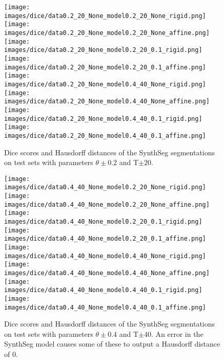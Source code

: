 \begin{figure}
  \centering
  \texttt{[image: images/dice/data0.2\_20\_None\_model0.2\_20\_None\_rigid.png]}
  \texttt{[image: images/dice/data0.2\_20\_None\_model0.2\_20\_None\_affine.png]}
  \\
  \texttt{[image: images/dice/data0.2\_20\_None\_model0.2\_20\_0.1\_rigid.png]}
  \texttt{[image: images/dice/data0.2\_20\_None\_model0.2\_20\_0.1\_affine.png]}
  \\
  \texttt{[image: images/dice/data0.2\_20\_None\_model0.4\_40\_None\_rigid.png]}
  \texttt{[image: images/dice/data0.2\_20\_None\_model0.4\_40\_None\_affine.png]}
  \\
  \texttt{[image: images/dice/data0.2\_20\_None\_model0.4\_40\_0.1\_rigid.png]}
  \texttt{[image: images/dice/data0.2\_20\_None\_model0.4\_40\_0.1\_affine.png]}
  \caption{Dice scores and Hausdorff distances of the SynthSeg segmentations on test sets with parameters $\theta\pm0.2$ and T$\pm20$.}
  \label{fig:dice_haus_2}
\end{figure}

\begin{figure}
  \centering
  \texttt{[image: images/dice/data0.4\_40\_None\_model0.2\_20\_None\_rigid.png]}
  \texttt{[image: images/dice/data0.4\_40\_None\_model0.2\_20\_None\_affine.png]}
  \\
  \texttt{[image: images/dice/data0.4\_40\_None\_model0.2\_20\_0.1\_rigid.png]}
  \texttt{[image: images/dice/data0.4\_40\_None\_model0.2\_20\_0.1\_affine.png]}
  \\
  \texttt{[image: images/dice/data0.4\_40\_None\_model0.4\_40\_None\_rigid.png]}
  \texttt{[image: images/dice/data0.4\_40\_None\_model0.4\_40\_None\_affine.png]}
  \\
  \texttt{[image: images/dice/data0.4\_40\_None\_model0.4\_40\_0.1\_rigid.png]}
  \texttt{[image: images/dice/data0.4\_40\_None\_model0.4\_40\_0.1\_affine.png]}
  \caption{Dice scores and Hausdorff distances of the SynthSeg segmentations on test sets with parameters $\theta\pm0.4$ and T$\pm40$. An error in the SynthSeg model causes some of these to output a Hausdorff distance of $0$.}
  \label{fig:dice_haus_4}
\end{figure}
